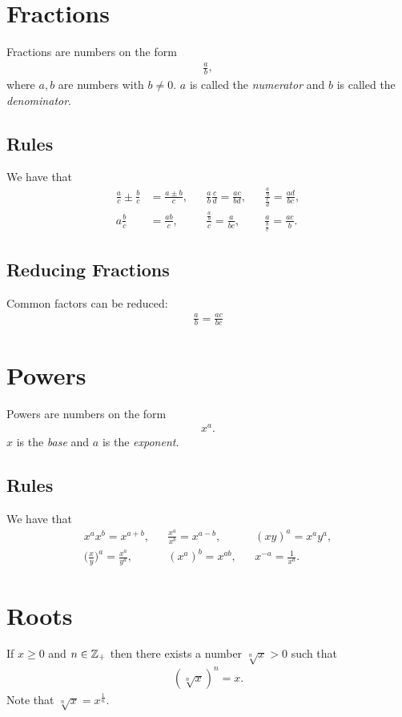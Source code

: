 \section{Fractions}
Fractions are numbers on the form
\begin{align*}
\frac{a}{b},
\end{align*}
where $a,b$ are numbers with $b\neq 0$. $a$ is called the \emph{numerator} and $b$ is called the \emph{denominator}.
\subsection{Rules}
We have that
\begin{align*}
\frac{a}{c}\pm\frac{b}{c}&=\frac{a\pm b}{c},&&\frac{a}{b}\frac{c}{d}=\frac{ac}{bd},&&\frac{\frac{a}{b}}{\frac{c}{d}}=\frac{ad}{bc},\\
a\frac{b}{c}&=\frac{ab}{c},&&\frac{\frac{a}{b}}{c}=\frac{a}{bc},&&\frac{a}{\frac{b}{c}}=\frac{ac}{b}.
\end{align*}
\subsection{Reducing Fractions}
Common factors can be reduced:
\begin{align*}
\frac{a}{b}=\frac{ac}{bc}
\end{align*}

\section{Powers}
Powers are numbers on the form
\begin{align*}
x^a.
\end{align*}
$x$ is the \emph{base} and $a$ is the \emph{exponent}.
\subsection{Rules}
We have that
\begin{align*}
x^ax^b=x^{a+b},&& \frac{x^a}{x^b}=x^{a-b},&&(xy)^a=x^ay^a,\\
\Big(\frac{x}{y}\Big)^a=\frac{x^a}{y^a},&&(x^a)^b=x^{ab},&& x^{-a}=\frac{1}{x^a}.
\end{align*}

\section{Roots}
If $x\geq 0$ and $n\in \mathbb{Z}_+$ then there exists a number $\sqrt[n]{x}>0$ such that
\begin{align*}
(\sqrt[n]{x})^n=x.
\end{align*}
Note that $\sqrt[n]{x}=x^{\frac{1}{n}}$.
